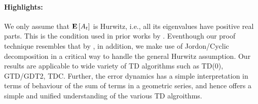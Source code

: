 \paragraph{Highlights:}
 We only assume that $\mathbf{E}\left[A_t\right]$ is Hurwitz, i.e., all its eigenvalues have positive real parts. This is the condition used in prior works by \cite{polyak-judisky,borkarbook}. Eventhough our proof technique resembles that by \cite{bach}, in addition, we make use of Jordon/Cyclic decomposition in a critical way to handle the general Hurwitz assumption. Our results are applicable to wide variety of TD algorithms such as TD(0), GTD/GDT2, TDC.
Further, the error dynamics has a simple interpretation in terms of behaviour of the sum of terms in a geometric series, and hence offers a simple and unified understanding of the various TD algroithms.
\begin{comment}
A host of algorithms in machine learning and in particular, the temporal difference class of algorithms arising in reinforcement learning, turn out to be special cases of \eqref{eq:sa}, namley linear stochastic approximation (LSA) algorithms. LSA algorithms assume the general form
 Further, in most instances of LSA $A_t$ turns out to be a rank-$1$ matrix and $A_t\theta_{t-1}$ can be computed in $O(n)$, and are desired for this low per iteration computational cost. Recently, \cite{bach} used \eqref{eq:lsaintro} with constant step-size, i.e., $\alpha_t=\alpha,\,\forall t\geq 0, \, \alpha >0$ and PR-averaging for the linear prediction problem with squared loss and $i.i.d$ sampling. A ``remarkable'' result by \cite{bach} is that there exists a constant step-size such that for any problem where the noisy data is bounded by a known constant, he expected squared prediction error after $t$ updates is at most $\frac{C}{t}$ with a constant $C>0$ that depends \emph{only} on the bound on the data.\todoc{Dimension?}

In particular, as opposed to many earlier results available in the literature \todoc{Add citations}, $C$ does \emph{not} depend on the conditioning of the underlying system, while the total runtime of the algorithm scales linearly with both $t$ and $n$.\par
In this paper, we want to understand the performance of constant step size with PR-average of iterates for general class of LSAs (outside of the linear prediction setting considered by \cite{bach}). We are interested in the problem of linear value function approximation in reinforcement learning using temporal difference learning (TD) either from experience replay in a batch setting or solving linear systems using TD-style algorithms.
\todoc{TD-style, or just TD?} \todoc{Later we need to comment on TD with eligibility traces and other variations of TD, e.g., new variants.} We now list our contributions, and its implications to the TD class of algorithms, and the key differences between the techniques employed here in comparison to \cite{bach}. We now list our contributions, the implications of our results, and the challenges presented by the general setting in comparison to the linear prediction setting considered by \cite{bach}.

\end{comment}

